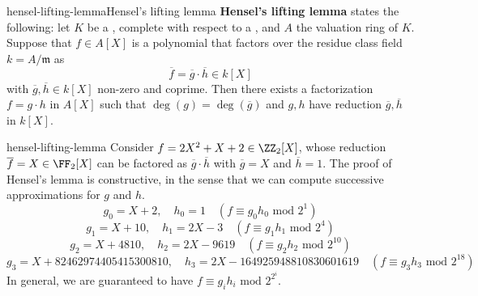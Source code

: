     

\begin{topic}{hensel-lifting-lemma}{Hensel's lifting lemma}
    \textbf{Hensel's lifting lemma} states the following: let $K$ be a , complete with respect to a  , and $A$ the valuation ring of $K$. Suppose that $f \in A[X]$ is a polynomial that factors over the residue class field $k = A / \mathfrak{m}$ as
    \[ \overline{f} = \overline{g} \cdot \overline{h} \in k[X] \]
    with $\overline{g}, \overline{h} \in k[X]$ non-zero and coprime. Then there exists a factorization $f = g \cdot h$ in $A[X]$ such that $\deg(g) = \deg(\overline{g})$ and $g, h$ have reduction $\overline{g}, \overline{h}$ in $k[X]$.
\end{topic}

\begin{example}{hensel-lifting-lemma}
    Consider $f = 2X^2 + X + 2 \in \ZZ_2[X]$, whose reduction $\overline{f} = X \in \FF_2[X]$ can be factored as $\overline{g} \cdot \overline{h}$ with $\overline{g} = X$ and $\overline{h} = 1$. The proof of Hensel's lemma is constructive, in the sense that we can compute successive approximations for $g$ and $h$.
    \[ g_0 = X + 2, \quad h_0 = 1 \quad (f \equiv g_0 h_0 \text{ mod } 2^1) \]
    \[ g_1 = X + 10, \quad h_1 = 2X - 3 \quad (f \equiv g_1 h_1 \text{ mod } 2^4) \]
    \[ g_2 = X + 4810, \quad h_2 = 2X - 9619 \quad (f \equiv g_2 h_2 \text{ mod } 2^{10}) \]
    \[ g_3 = X + 82462974405415300810, \quad h_3 = 2X - 164925948810830601619 \quad (f \equiv g_3 h_3 \text{ mod } 2^{18}) \]
    In general, we are guaranteed to have $f \equiv g_i h_i \text{ mod } 2^{2^i}$.
\end{example}
